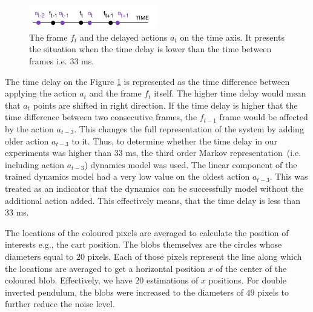 \begin{figure}[H]
\centering
\includegraphics[width=0.5\textwidth, scale=0.5]{plots/cam_delay}
\caption{\label{fig:exps:camdelay} The frame $f_{t}$ and the delayed actions $a_{t}$ on the time axis. It presents the situation when the time delay is lower than the time between frames i.e. $33$ ms.}
\end{figure}

\noindent The time delay on the Figure \ref{fig:exps:camdelay} is represented as the time difference between applying the action $a_{t}$ and the frame $f_{t}$ itself. The higher time delay would mean that $a_{t}$ points are shifted in right direction. If the time delay is higher that the time difference between two consecutive frames, the $f_{t-1}$ frame would be affected by the action $a_{t-3}$. This changes the full representation of the system by adding older action $a_{t-3}$ to it. Thus, to determine whether the time delay in our experiments was higher than $33$ ms, the third order Markov representation\ (i.e. including action $a_{t-3}$) dynamics model was used. The linear component of the trained dynamics model had a very low value on the oldest action $a_{t-3}$. This was treated as an indicator that the dynamics can be successfully model without the additional action added. This effectively means, that the time delay is less than $33$ ms.

\noindent The locations of the coloured pixels are averaged to calculate the position of interests e.g., the cart position. The blobs themselves are the circles whose diameters equal to $20$ pixels. Each of those pixels represent the line along which the locations are averaged to get a horizontal position $x$ of the center of the coloured blob. Effectively, we have $20$ estimations of $x$ positions. For double inverted pendulum, the blobs were increased to the diameters of $49$ pixels to further reduce the noise level.

